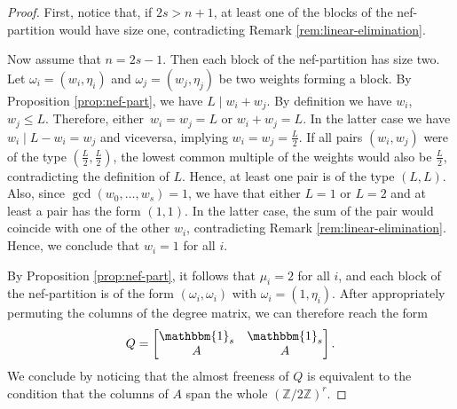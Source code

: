 \documentclass[10pt,a4paper]{amsart}
\newcommand{\Z}{\mathbb{Z}}
\begin{document}
\begin{proof}
    First, notice that, if $2s>n+1$, at least one of the blocks of the nef-partition would have size one, contradicting Remark \ref{rem:linear-elimination}.
    
    Now assume that $n=2s-1$. Then each block of the nef-partition has size two.
    Let $\omega_i=(w_i,\eta_i)$ and $\omega_j=(w_j,\eta_j)$ be two weights forming a block.
    By Proposition \ref{prop:nef-part}, we have $L \mid w_i + w_j$.
    By definition we have $w_i$, $w_j \le L$. Therefore, either~$w_i = w_j = L$ or $w_i+w_j=L$. In the latter case we have $w_i \mid L-w_i=w_j$ and viceversa, implying $w_i=w_j=\frac{L}{2}$.
    If all pairs $(w_i,w_j)$ were of the type $\left(\frac{L}{2},\frac{L}{2}\right)$, the lowest common multiple of the weights would also be $\frac{L}{2}$, contradicting the definition of $L$. Hence, at least one pair is of the type $(L,L)$. Also, since $\gcd(w_0,\dots,w_s)=1$, we have that either $L=1$ or $L=2$ and at least a pair has the form $(1,1)$. In the latter case, the sum of the pair would coincide with one of the other $w_i$, contradicting Remark \ref{rem:linear-elimination}. Hence, we conclude that $w_i=1$ for all $i$.

    By Proposition \ref{prop:nef-part}, it follows that $\mu_i=2$ for all $i$, and each block of the nef-partition is of the form $(\omega_i,\omega_i)$ with $\omega_i=(1,\eta_i)$. After appropriately permuting the columns of the degree matrix, we can therefore reach the form
    $$
    Q = \begin{bmatrix}
    \mathbbm{1}_{s} & \mathbbm{1}_s \\
    A & A
    \end{bmatrix}.
    $$
    We conclude by noticing that the almost freeness of $Q$ is equivalent to the condition that the columns of $A$ span the whole $(\Z/2\Z)^r$.
\end{proof}
\end{document}
